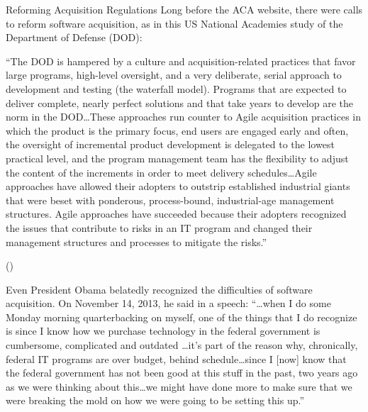 \begin{elaboration}{Reforming Acquisition Regulations}
Long before the ACA website, there were calls to reform software acquisition, as in this US National Academies study of the Department of Defense (DOD):

``The DOD is hampered by a culture and acquisition-related practices that favor large programs, high-level oversight, and a very deliberate, serial approach to development and testing (the waterfall model). Programs that are expected to deliver complete, nearly perfect solutions and that take years to develop are the norm in the DOD\ldots These approaches run counter to Agile acquisition practices in which the product is the primary focus, end users are engaged early and often, the oversight of incremental product development is delegated to the lowest practical level, and the program management team has the flexibility to adjust the content of the increments in order to meet delivery schedules\ldots Agile approaches have allowed their adopters to outstrip established industrial giants that were beset with ponderous, process-bound, industrial-age management structures. Agile approaches have succeeded because their adopters recognized the issues that contribute to risks in an IT program and changed their management structures and processes to mitigate the risks.''

(\cite{national2010Achieving})

Even President Obama belatedly recognized the difficulties of software acquisition.  On November 14, 2013, he said in a speech:
``\ldots when I do some Monday morning quarterbacking on myself, one of the things that I do recognize is since I know how we purchase technology in the federal government is cumbersome, complicated and outdated \ldots  it's part of the reason why, chronically, federal IT programs are over budget, behind schedule\ldots since I [now] know that the federal government has not been good at this stuff in the past, two years ago as we were thinking about this\ldots we might have done more to make sure that we were breaking the mold on how we were going to be setting this up.''
\end{elaboration}
